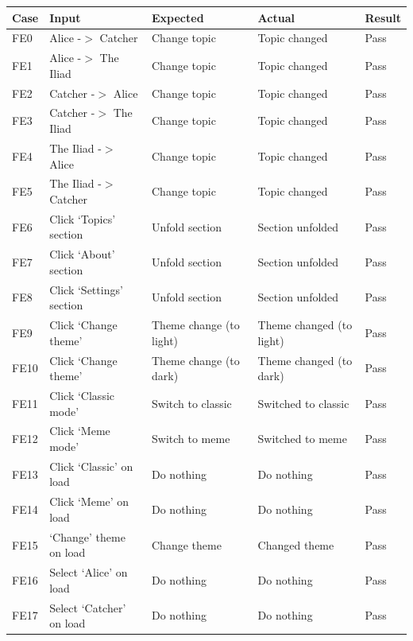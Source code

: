 \documentclass[12pt]{report}
\begin{document}
\begin{appendices}
\begin{table}[ht]
  \centering
  \begin{tabular}{lllll}
  \toprule   
  {Case} & {Input} & {Expected} & {Actual} & {Result}\\
  \midrule
  FE0 & Alice -$>$ Catcher & Change topic & Topic changed & Pass\\ 
  \addlinespace[3pt]
  FE1 & Alice -$>$ The Iliad & Change topic & Topic changed & Pass\\
  \addlinespace[3pt]
  FE2 & Catcher -$>$ Alice & Change topic & Topic changed & Pass\\
  \addlinespace[3pt]
  FE3 & Catcher -$>$ The Iliad & Change topic & Topic changed & Pass\\
  \addlinespace[3pt]
  FE4 & The Iliad -$>$ Alice & Change topic & Topic changed & Pass\\
  \addlinespace[3pt]
  FE5 & The Iliad -$>$ Catcher & Change topic & Topic changed & Pass\\
  \addlinespace[3pt]
  FE6 & Click `Topics' section & Unfold section & Section unfolded & Pass\\
  \addlinespace[3pt]
  FE7 & Click `About' section & Unfold section & Section unfolded & Pass\\
  \addlinespace[3pt]
  FE8 & Click `Settings' section & Unfold section & Section unfolded & Pass\\
  \addlinespace[3pt]
  FE9 & Click `Change theme' & Theme change (to light) & Theme changed (to light) & Pass\\
  \addlinespace[3pt]
  FE10 & Click `Change theme' & Theme change (to dark) & Theme changed (to dark) & Pass\\
  \addlinespace[3pt]
  FE11 & Click `Classic mode' & Switch to classic & Switched to classic & Pass\\
  \addlinespace[3pt]
  FE12 & Click `Meme mode' & Switch to meme & Switched to meme & Pass\\
  \addlinespace[3pt]
  FE13 & Click `Classic' on load & Do nothing & Do nothing & Pass\\
  \addlinespace[3pt]
  FE14 & Click `Meme' on load & Do nothing & Do nothing & Pass\\
  \addlinespace[3pt]
  FE15 & `Change' theme on load & Change theme & Changed theme & Pass\\
  \addlinespace[3pt]
  FE16 & Select `Alice' on load & Do nothing & Do nothing & Pass\\
  \addlinespace[3pt]
  FE17 & Select `Catcher' on load & Do nothing & Do nothing & Pass\\

\end{tabular}
\end{table}
\end{appendices}
\end{document}
